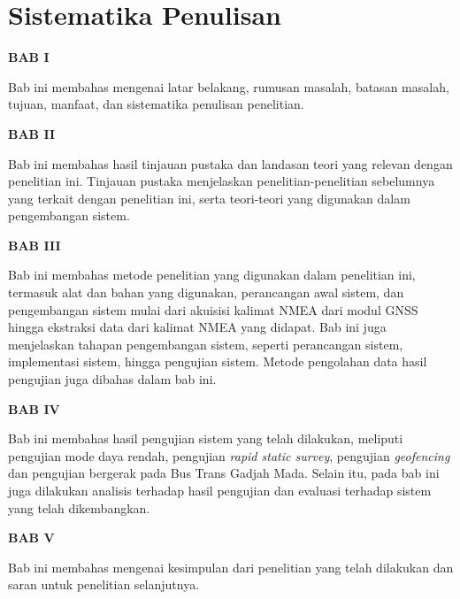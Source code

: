 \section{Sistematika Penulisan}
\textbf{BAB I}

Bab ini membahas mengenai latar belakang, rumusan masalah, batasan masalah, tujuan, manfaat, dan sistematika penulisan penelitian.

\textbf{BAB II}

Bab ini membahas hasil tinjauan pustaka dan landasan teori yang relevan dengan penelitian ini. Tinjauan pustaka menjelaskan penelitian-penelitian sebelumnya yang terkait dengan penelitian ini, serta teori-teori yang digunakan dalam pengembangan sistem.

\textbf{BAB III}

Bab ini membahas metode penelitian yang digunakan dalam penelitian ini, termasuk alat dan bahan yang digunakan, perancangan awal sistem, dan pengembangan sistem mulai dari akuisisi kalimat NMEA dari modul GNSS hingga ekstraksi data dari kalimat NMEA yang didapat. Bab ini juga menjelaskan tahapan pengembangan sistem, seperti perancangan sistem, implementasi sistem, hingga pengujian sistem. Metode pengolahan data hasil pengujian juga dibahas dalam bab ini.  

\textbf{BAB IV}

Bab ini membahas hasil pengujian sistem yang telah dilakukan, meliputi pengujian mode daya rendah, pengujian \textit{rapid static survey}, pengujian \textit{geofencing} dan pengujian bergerak pada Bus Trans Gadjah Mada. Selain itu, pada bab ini juga dilakukan analisis terhadap hasil pengujian dan evaluasi terhadap sistem yang telah dikembangkan.

\textbf{BAB V}

Bab ini membahas mengenai kesimpulan dari penelitian yang telah dilakukan dan saran untuk penelitian selanjutnya.